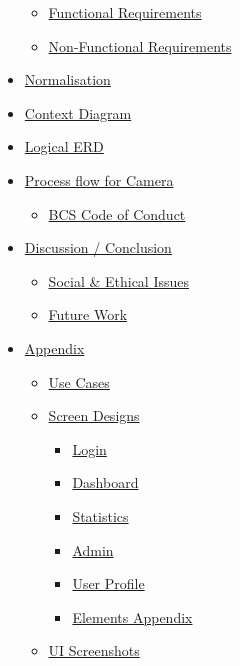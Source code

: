 \documentclass[
  english,
  a4paper,
,tablecaptionabove
]{scrartcl}
\providecommand{\tightlist}{%
  \setlength{\itemsep}{0pt}\setlength{\parskip}{0pt}}
\begin{document}
\begin{itemize}
  \begin{itemize}
  \tightlist
  \item
    \protect\hyperlink{functional-requirements}{Functional Requirements}
  \item
    \protect\hyperlink{non-functional-requirements}{Non-Functional
    Requirements}
  \end{itemize}
\item
  \protect\hyperlink{normalisation}{Normalisation}
\item
  \protect\hyperlink{context-diagram}{Context Diagram}
\item
  \protect\hyperlink{logical-erd}{Logical ERD}
\item
  \protect\hyperlink{process-flow-for-camera}{Process flow for Camera}

  \begin{itemize}
  \tightlist
  \item
    \protect\hyperlink{bcs-code-of-conduct}{BCS Code of Conduct}
  \end{itemize}
\item
  \protect\hyperlink{discussion--conclusion}{Discussion / Conclusion}

  \begin{itemize}
  \tightlist
  \item
    \protect\hyperlink{social--ethical-issues}{Social \& Ethical Issues}
  \item
    \protect\hyperlink{future-work}{Future Work}
  \end{itemize}
\item
  \protect\hyperlink{appendix}{Appendix}

  \begin{itemize}
  \tightlist
  \item
    \protect\hyperlink{use-cases}{Use Cases}
  \item
    \protect\hyperlink{screen-designs}{Screen Designs}

    \begin{itemize}
    \tightlist
    \item
      \protect\hyperlink{login}{Login}
    \item
      \protect\hyperlink{dashboard}{Dashboard}
    \item
      \protect\hyperlink{statistics}{Statistics}
    \item
      \protect\hyperlink{admin}{Admin}
    \item
      \protect\hyperlink{user-profile}{User Profile}
    \item
      \protect\hyperlink{elements-appendix}{Elements Appendix}
    \end{itemize}
  \item
    \protect\hyperlink{ui-screenshots}{UI Screenshots}


\end{itemize}
\end{itemize}
\end{document}

